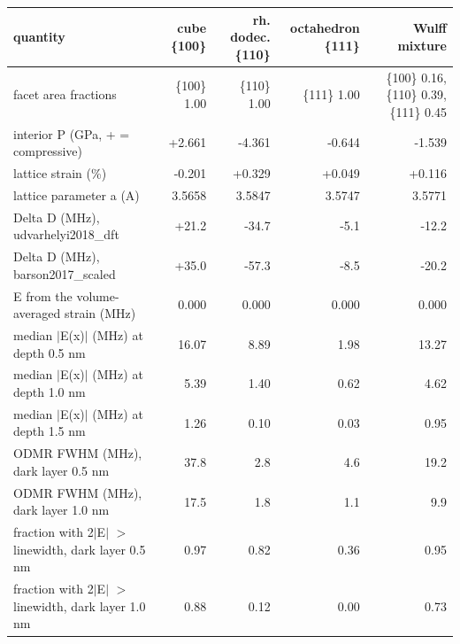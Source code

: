\begin{table}[htbp]
  \label{tab:t4-predicted-D-and-E}
  \begin{tabular}{lrrrr}
    \toprule
    quantity & cube \{100\} & rh. dodec. \{110\} & octahedron \{111\} & Wulff mixture \\
    \midrule
    facet area fractions & \{100\} 1.00 & \{110\} 1.00 & \{111\} 1.00 & \{100\} 0.16, \{110\} 0.39, \{111\} 0.45 \\
    interior P (GPa, + = compressive) & +2.661 & -4.361 & -0.644 & -1.539 \\
    lattice strain (\%) & -0.201 & +0.329 & +0.049 & +0.116 \\
    lattice parameter a (A) & 3.5658 & 3.5847 & 3.5747 & 3.5771 \\
    Delta D (MHz), udvarhelyi2018\_dft & +21.2 & -34.7 & -5.1 & -12.2 \\
    Delta D (MHz), barson2017\_scaled & +35.0 & -57.3 & -8.5 & -20.2 \\
    E from the volume-averaged strain (MHz) & 0.000 & 0.000 & 0.000 & 0.000 \\
    median $|$E(x)$|$ (MHz) at depth 0.5 nm & 16.07 & 8.89 & 1.98 & 13.27 \\
    median $|$E(x)$|$ (MHz) at depth 1.0 nm & 5.39 & 1.40 & 0.62 & 4.62 \\
    median $|$E(x)$|$ (MHz) at depth 1.5 nm & 1.26 & 0.10 & 0.03 & 0.95 \\
    ODMR FWHM (MHz), dark layer 0.5 nm & 37.8 & 2.8 & 4.6 & 19.2 \\
    ODMR FWHM (MHz), dark layer 1.0 nm & 17.5 & 1.8 & 1.1 & 9.9 \\
    fraction with 2$|$E$|$ $>$ linewidth, dark layer 0.5 nm & 0.97 & 0.82 & 0.36 & 0.95 \\
    fraction with 2$|$E$|$ $>$ linewidth, dark layer 1.0 nm & 0.88 & 0.12 & 0.00 & 0.73 \\
    \bottomrule
  \end{tabular}
\end{table}
